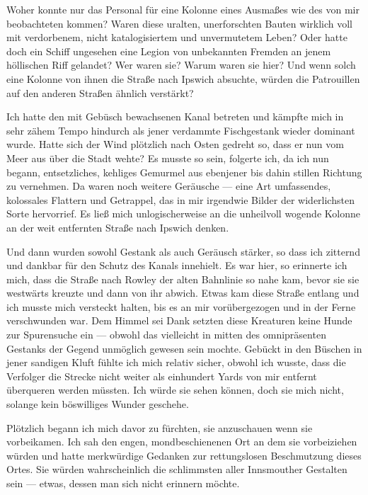 Woher konnte nur das Personal für eine Kolonne eines Ausmaßes wie des von mir beobachteten kommen? Waren diese uralten, unerforschten Bauten wirklich voll mit verdorbenem, nicht katalogisiertem und unvermutetem Leben? Oder hatte doch ein Schiff ungesehen eine Legion von unbekannten Fremden an jenem höllischen Riff gelandet? Wer waren sie? Warum waren sie hier? Und wenn solch eine Kolonne von ihnen die Straße nach Ipswich absuchte, würden die Patrouillen auf den anderen Straßen ähnlich verstärkt?

Ich hatte den mit Gebüsch bewachsenen Kanal betreten und kämpfte mich in sehr zähem Tempo hindurch als jener verdammte Fischgestank wieder dominant wurde. Hatte sich der Wind plötzlich nach Osten gedreht so, dass er nun vom Meer aus über die Stadt wehte? Es musste so sein, folgerte ich, da ich nun begann, entsetzliches, kehliges Gemurmel aus ebenjener bis dahin stillen Richtung zu vernehmen. Da waren noch weitere Geräusche --- eine Art umfassendes, kolossales Flattern und Getrappel, das in mir irgendwie Bilder der widerlichsten Sorte hervorrief. Es ließ mich unlogischerweise an die unheilvoll wogende Kolonne an der weit entfernten Straße nach Ipswich denken.

Und dann wurden sowohl Gestank als auch Geräusch stärker, so dass ich zitternd und dankbar für den Schutz des Kanals innehielt. Es war hier, so erinnerte ich mich, dass die Straße nach Rowley der alten Bahnlinie so nahe kam, bevor sie sie westwärts kreuzte und dann von ihr abwich. Etwas kam diese Straße entlang und ich musste mich versteckt halten, bis es an mir vorübergezogen und in der Ferne verschwunden war. Dem Himmel sei Dank setzten diese Kreaturen keine Hunde zur Spurensuche ein --- obwohl das vielleicht in mitten des omnipräsenten Gestanks der Gegend unmöglich gewesen sein mochte. Gebückt in den Büschen in jener sandigen Kluft fühlte ich mich relativ sicher, obwohl ich wusste, dass die Verfolger die Strecke nicht weiter als einhundert Yards von mir entfernt überqueren werden müssten. Ich würde sie sehen können, doch sie mich nicht, solange kein böswilliges Wunder geschehe.

Plötzlich begann ich mich davor zu fürchten, sie anzuschauen wenn sie vorbeikamen. Ich sah den engen, mondbeschienenen Ort an dem sie vorbeiziehen würden und hatte merkwürdige Gedanken zur rettungslosen Beschmutzung dieses Ortes. Sie würden wahrscheinlich die schlimmsten aller Innsmouther Gestalten sein --- etwas, dessen man sich nicht erinnern möchte.

